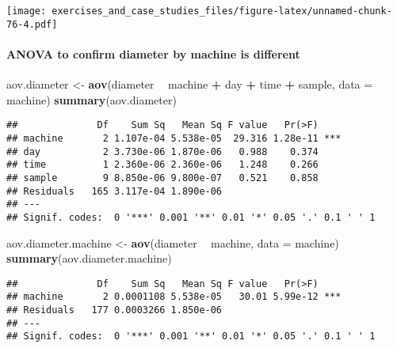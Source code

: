 \documentclass[]{book}
\newenvironment{Shaded}{\begin{snugshade}}{\end{snugshade}}
\newcommand{\DataTypeTok}[1]{\textcolor[rgb]{0.13,0.29,0.53}{#1}}
\newcommand{\KeywordTok}[1]{\textcolor[rgb]{0.13,0.29,0.53}{\textbf{#1}}}
\newcommand{\NormalTok}[1]{#1}
\newcommand{\OperatorTok}[1]{\textcolor[rgb]{0.81,0.36,0.00}{\textbf{#1}}}
\newcommand{\StringTok}[1]{\textcolor[rgb]{0.31,0.60,0.02}{#1}}
\let\oldparagraph\paragraph
\renewcommand{\paragraph}[1]{\oldparagraph{#1}\mbox{}}
\theoremstyle{definition}
\theoremstyle{definition}
\theoremstyle{definition}
\theoremstyle{remark}
\begin{document}
\texttt{[image: exercises\_and\_case\_studies\_files/figure-latex/unnamed-chunk-76-4.pdf]}

\hypertarget{anova-to-confirm-diameter-by-machine-is-different}{%
\paragraph{ANOVA to confirm diameter by machine is
different}\label{anova-to-confirm-diameter-by-machine-is-different}}

\begin{Shaded}
\begin{Highlighting}[]
\NormalTok{aov.diameter <-}\StringTok{ }\KeywordTok{aov}\NormalTok{(diameter }\OperatorTok{~}\StringTok{ }\NormalTok{machine }\OperatorTok{+}\StringTok{ }\NormalTok{day }\OperatorTok{+}\StringTok{ }\NormalTok{time }\OperatorTok{+}\StringTok{ }\NormalTok{sample, }\DataTypeTok{data =}\NormalTok{ machine)}
\KeywordTok{summary}\NormalTok{(aov.diameter)}
\end{Highlighting}
\end{Shaded}

\begin{verbatim}
##              Df    Sum Sq   Mean Sq F value   Pr(>F)    
## machine       2 1.107e-04 5.538e-05  29.316 1.28e-11 ***
## day           2 3.730e-06 1.870e-06   0.988    0.374    
## time          1 2.360e-06 2.360e-06   1.248    0.266    
## sample        9 8.850e-06 9.800e-07   0.521    0.858    
## Residuals   165 3.117e-04 1.890e-06                     
## ---
## Signif. codes:  0 '***' 0.001 '**' 0.01 '*' 0.05 '.' 0.1 ' ' 1
\end{verbatim}

\begin{Shaded}
\begin{Highlighting}[]
\NormalTok{aov.diameter.machine <-}\StringTok{ }\KeywordTok{aov}\NormalTok{(diameter }\OperatorTok{~}\StringTok{ }\NormalTok{machine, }\DataTypeTok{data =}\NormalTok{ machine)}
\KeywordTok{summary}\NormalTok{(aov.diameter.machine)}
\end{Highlighting}
\end{Shaded}

\begin{verbatim}
##              Df    Sum Sq   Mean Sq F value   Pr(>F)    
## machine       2 0.0001108 5.538e-05   30.01 5.99e-12 ***
## Residuals   177 0.0003266 1.850e-06                     
## ---
## Signif. codes:  0 '***' 0.001 '**' 0.01 '*' 0.05 '.' 0.1 ' ' 1
\end{verbatim}
\end{document}
